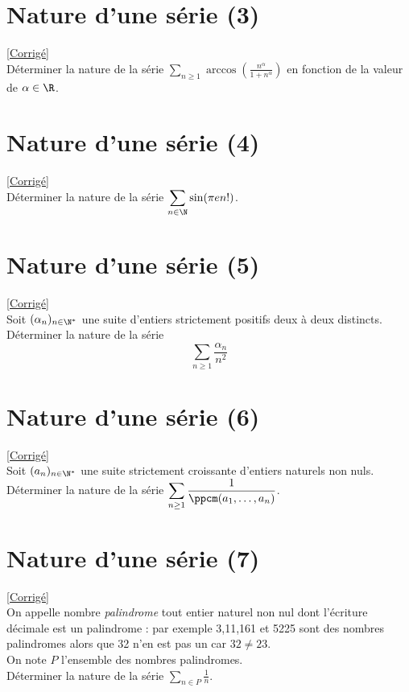 \documentclass{book}
\begin{document}
	\section{Nature d'une série (3) }
	\label{Nature d'une série (4)}
	\textcolor{blue}{\hyperref[Nature d'une série (4) corrigé]{[Corrigé]}}\\
	Déterminer la nature de la série $\displaystyle\sum_{n\geq 1}\arccos\left(\frac{n^\alpha}{1+n^\alpha}\right)$ en fonction de la valeur de $\alpha\in \R$.
	
	\section{Nature d'une série (4) }
	\label{Nature d'une série (4)}
	\textcolor{blue}{\hyperref[Nature d'une série (4) corrigé]{[Corrigé]}}\\
	Déterminer la nature de la série $\displaystyle\sum_{n\in \N}\sin(\pi en!)$.
	
	\section{Nature d'une série (5) }
	\label{Nature d'une série (5)}
	\textcolor{blue}{\hyperref[Nature d'une série (5) corrigé]{[Corrigé]}}\\
	Soit $(\alpha_n)_{n\in \N^*}$ une suite d'entiers strictement positifs deux à deux distincts. Déterminer la nature de la série
	$$\sum_{n\geq 1}\frac{\alpha_n}{n^2}$$
	
	\section{Nature d'une série (6) }
	\label{Nature d'une série (6)}
	\textcolor{blue}{\hyperref[Nature d'une série (6) corrigé]{[Corrigé]}}\\
	Soit $(a_n)_{n\in \N^*}$ une suite strictement croissante d'entiers naturels non nuls.\\
	Déterminer la nature de la série $\displaystyle\sum\limits_{n\geq 1}\frac{1}{\ppcm(a_1,\dots,a_n)}$.
	
	\section{Nature d'une série (7) }
	\label{Nature d'une série (7)}
	\textcolor{blue}{\hyperref[Nature d'une série (7) corrigé]{[Corrigé]}}\\
	On appelle nombre \textit{palindrome} tout entier naturel non nul dont l'écriture décimale est un palindrome : par exemple 3,11,161 et 5225 sont des nombres palindromes alors que 32 n'en est pas un car $32\ne 23$.\\
	On note $P$ l'ensemble des nombres palindromes.\\
	Déterminer la nature de la série $\displaystyle\sum_{n\in P}\frac{1}{n}$.
	
\end{document}
